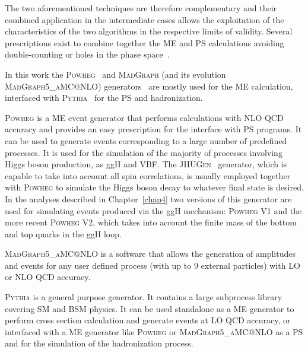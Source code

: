The two aforementioned techniques are therefore complementary and their combined application in the intermediate cases allows the exploitation of the characteristics of the two algorithms in the respective limits of validity. Several prescriptions exist to combine together the ME and PS calculations avoiding double-counting or holes in the phase space~\cite{Hoche:2006ph}.

In this work the \textsc{Powheg}~\cite{Kramer:2005hw,Frixione:2007vw,Lavesson:2008ah,Alioli:2008tz, Nason:2009ai} and \textsc{MadGraph} (and its evolution \textsc{MadGraph5\_aMC@NLO}) generators~\cite{Alwall:2014hca} are mostly used for the ME calculation, interfaced with \textsc{Pythia}~\cite{Sjostrand:2006za,Sjostrand:2007gs} for the PS and hadronization. 

\textsc{Powheg} is a ME event generator that performs calculations with NLO QCD accuracy and provides an easy prescription for the interface with PS programs. It can be used to generate events corresponding to a large number of predefined processes. It is used for the simulation of the majority of processes involving Higgs boson production, as ggH and VBF. The \textsc{JHUGen}~\cite{JHUGen} generator, which is capable to take into account all spin correlations, is usually employed together with \textsc{Powheg} to simulate the Higgs boson decay to whatever final state is desired. In the analyses described in Chapter~\ref{chap4} two versions of this generator are used for simulating events produced via the ggH mechanism: \textsc{Powheg V1} and the more recent \textsc{Powheg V2}, which takes into account the finite mass of the bottom and top quarks in the ggH loop.

\textsc{MadGraph5\_aMC@NLO} is a software that allows the generation of amplitudes and events for any user defined process (with up to 9 external particles) with LO or NLO QCD accuracy.

\textsc{Pythia} is a general purpose generator. It contains a large subprocess library covering SM and BSM physics. It can be used standalone as a ME generator to perform cross section calculation and generate events at LO QCD accuracy, or interfaced with a ME generator like \textsc{Powheg} or \textsc{MadGraph5\_aMC@NLO} as a PS and for the simulation of the hadronization process.

